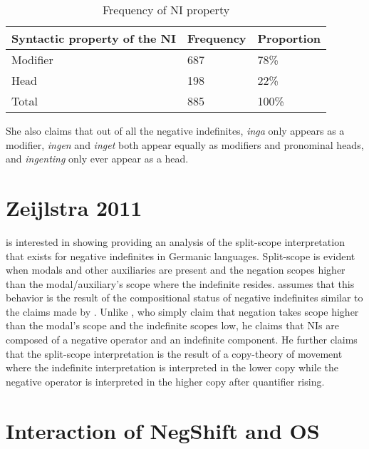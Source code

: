 \documentclass[12pt, letterpaper]{article}
\begin{document}
	\begin{table}[h!]
	\centering
	\caption{Frequency of NI property}
	\begin{tabular}{lll}
	Syntactic property of the NI & Frequency & Proportion\\
	\hline
	Modifier & 687 & 78\% \\
	Head & 198 & 22\% \\
	\hline
	Total & 885 & 100\%  \\
	\hline 
	\end{tabular}
	\end{table}

\ex She also claims that out of all the negative indefinites, \textit{inga} only appears as a modifier, \textit{ingen} and \textit{inget} both appear equally as modifiers and pronominal heads, and \textit{ingenting} only ever appear as a head. 
\z 

\section{Zeijlstra 2011} \label{sec:ZEIJLSTRA}

\ea \cite{zeijlstraSyntacticallyComplexStatus2011} is interested in showing providing an analysis of the split-scope interpretation that exists for negative indefinites in Germanic languages. 
\ex Split-scope is evident when modals and other auxiliaries are present and the negation scopes higher than the modal/auxiliary's scope where the indefinite resides. 
\ex \citeauthor{zeijlstraSyntacticallyComplexStatus2011} assumes that this behavior is the result of the compositional status of negative indefinites similar to the claims made by \citet{iatridouNegativeDPsAMovement2011}. Unlike \citeauthor{iatridouNegativeDPsAMovement2011}, who simply claim that negation takes scope higher than the modal's scope and the indefinite scopes low, he claims that NIs are composed of a negative operator and an indefinite component.
\ex He further claims that the split-scope interpretation is the result of a copy-theory of movement where the indefinite interpretation is interpreted in the lower copy while the negative operator is interpreted in the higher copy after quantifier rising. 
\z 

\section{Interaction of NegShift and OS} \label{sec:NEG-OS}
\end{document}
